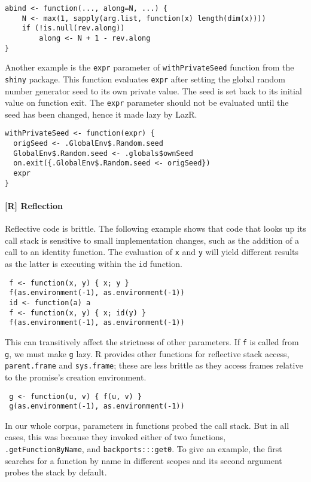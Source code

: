 \documentclass[review,creen,acmsmall]{acmart}
\newcommand{\code}[1]{\lstinline |#1|\xspace}
\renewcommand{\c}[1]{\lstinline |#1|\xspace}
\newcommand{\lazr}{{\sf LazR}\xspace}
\begin{document}
\begin{lstlisting}
abind <- function(..., along=N, ...) {
    N <- max(1, sapply(arg.list, function(x) length(dim(x))))
    if (!is.null(rev.along))
        along <- N + 1 - rev.along
}
\end{lstlisting}

Another example is the \code{expr} parameter of \code{withPrivateSeed} function
from the \code{shiny} package. This function evaluates \code{expr} after setting
the global random number generator seed to its own private value. The seed is
set back to its initial value on function exit. The \code{expr} parameter should
not be evaluated until the seed has been changed, hence it made lazy by \lazr.

\begin{lstlisting}
withPrivateSeed <- function(expr) {
  origSeed <- .GlobalEnv$.Random.seed
  GlobalEnv$.Random.seed <- .globals$ownSeed
  on.exit({.GlobalEnv$.Random.seed <- origSeed})
  expr
}
\end{lstlisting}

\paragraph{{\normalfont \textbf{[R]}} Reflection}
Reflective code is brittle. The following example shows that code that looks up
its call stack is sensitive to small implementation changes, such as the
addition of a call to an identity function. The evaluation of \c x and \c y will
yield different results as the latter is executing within the \c{id} function.
%
\begin{lstlisting}
 f <- function(x, y) { x; y }
 f(as.environment(-1), as.environment(-1))
 id <- function(a) a
 f <- function(x, y) { x; id(y) }
 f(as.environment(-1), as.environment(-1))
\end{lstlisting}
%

This can transitively affect the strictness of other parameters. If \c{f} is
called from \c{g}, we must make \c{g} lazy. R provides other functions for
reflective stack access, \c{parent.frame} and \c{sys.frame}; these are less
brittle as they access frames relative to the promise's creation environment.

\begin{lstlisting}
 g <- function(u, v) { f(u, v) }
 g(as.environment(-1), as.environment(-1))
\end{lstlisting}

In our whole corpus, \RefCountParametersTotal parameters in
\RefCountFunctionsTotal functions probed the call stack. But in all cases, this
was because they invoked either of two functions, \c{.getFunctionByName}, and
\c{backports:::get0}. To give an example, the first searches for a function by
name in different scopes and its second argument probes the stack by default.
\end{document}
